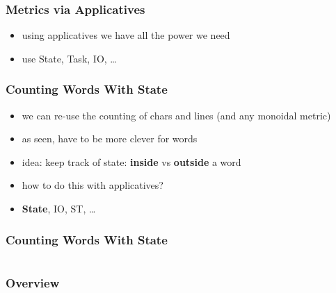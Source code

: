 \documentclass[aspectratio=169]{beamer}
\begin{document}
\begin{frame}
  \frametitle{Metrics via Applicatives}
  \begin{itemize}
  \item using applicatives we have all the power we need
  \item use State, Task, IO, \ldots
  \end{itemize}
\end{frame}

\begin{frame}
  \frametitle{Counting Words \textemdash{} With State}
  \begin{itemize}
  \item we can re-use the counting of chars and lines (and any monoidal metric)
  \item as seen, have to be more clever for words
  \item idea: keep track of state: \textbf{inside} vs \textbf{outside} a word
  \item how to do this with applicatives?
  \item \textbf{State}, IO, ST, \ldots{}
  \end{itemize}
\end{frame}

\begin{frame}[fragile]
  \frametitle{Counting Words \textemdash{} With State}
  \inputminted[fontsize=\small]{scala}{snippets/count-words-state.scala}
\end{frame}

\begin{frame}
  \frametitle{Overview}
  \def\firstcircle{(0,0) ellipse (20mm and 5mm)}
  \def\secondcircle{(0,0) ellipse (25mm and 12mm)}
  \def\thirdcircle{(0,0) ellipse (35mm and 20mm)}
  \begin{center}
  \end{center}
\end{frame}
\end{document}
